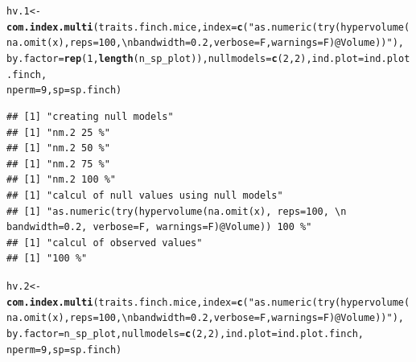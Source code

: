 \documentclass[12pt]{article}\usepackage[]{graphicx}\usepackage[]{color}
\makeatletter
\newcommand{\hlnum}[1]{\textcolor[rgb]{0.686,0.059,0.569}{#1}}%
\newcommand{\hlstr}[1]{\textcolor[rgb]{0.192,0.494,0.8}{#1}}%
\newcommand{\hlstd}[1]{\textcolor[rgb]{0.345,0.345,0.345}{#1}}%
\newcommand{\hlkwb}[1]{\textcolor[rgb]{0.69,0.353,0.396}{#1}}%
\newcommand{\hlkwc}[1]{\textcolor[rgb]{0.333,0.667,0.333}{#1}}%
\newcommand{\hlkwd}[1]{\textcolor[rgb]{0.737,0.353,0.396}{\textbf{#1}}}%
\newenvironment{kframe}{%
 \def\at@end@of@kframe{}%
 \ifinner\ifhmode%
  \def\at@end@of@kframe{\end{minipage}}%
  \begin{minipage}{\columnwidth}%
 \fi\fi%
 \def\FrameCommand##1{\hskip\@totalleftmargin \hskip-\fboxsep
 \colorbox{shadecolor}{##1}\hskip-\fboxsep
     \hskip-\linewidth \hskip-\@totalleftmargin \hskip\columnwidth}%
 \MakeFramed {\advance\hsize-\width
   \@totalleftmargin\z@ \linewidth\hsize
   \@setminipage}}%
 {\par\unskip\endMakeFramed%
 \at@end@of@kframe}
\newenvironment{knitrout}{}{} %
\makeatother
\begin{document}
\begin{knitrout}
\begin{kframe}
{\ttfamily\noindent\itshape\color{messagecolor}{\#\# Demo does not run by default to meet CRAN runtime requirements.\\\#\# This demo requires approximately 3 minutes to run.\\\#\# To run the demo, type\\\#\# 	doHypervolumeFinchDemo=TRUE\\\#\# 	demo(finch)\\\#\# at the R command line prompt.}}\end{kframe}
\end{knitrout}



\begin{knitrout}
\color{fgcolor}\begin{kframe}
\begin{alltt}
\hlstd{hv.1} \hlkwb{<-} \hlkwd{com.index.multi}\hlstd{(traits.finch.mice,} \hlkwc{index} \hlstd{=} \hlkwd{c}\hlstd{(}\hlstr{"as.numeric(try(hypervolume(na.omit(x), reps=100, \textbackslash{}n                                  bandwidth=0.2, verbose=F, warnings=F)@Volume))"}\hlstd{),}
    \hlkwc{by.factor} \hlstd{=} \hlkwd{rep}\hlstd{(}\hlnum{1}\hlstd{,} \hlkwd{length}\hlstd{(n_sp_plot)),} \hlkwc{nullmodels} \hlstd{=} \hlkwd{c}\hlstd{(}\hlnum{2}\hlstd{,} \hlnum{2}\hlstd{),} \hlkwc{ind.plot} \hlstd{= ind.plot.finch,}
    \hlkwc{nperm} \hlstd{=} \hlnum{9}\hlstd{,} \hlkwc{sp} \hlstd{= sp.finch)}
\end{alltt}
\begin{verbatim}
## [1] "creating null models"
## [1] "nm.2 25 %"
## [1] "nm.2 50 %"
## [1] "nm.2 75 %"
## [1] "nm.2 100 %"
## [1] "calcul of null values using null models"
## [1] "as.numeric(try(hypervolume(na.omit(x), reps=100, \n                                  bandwidth=0.2, verbose=F, warnings=F)@Volume)) 100 %"
## [1] "calcul of observed values"
## [1] "100 %"
\end{verbatim}
\begin{alltt}
\hlstd{hv.2} \hlkwb{<-} \hlkwd{com.index.multi}\hlstd{(traits.finch.mice,} \hlkwc{index} \hlstd{=} \hlkwd{c}\hlstd{(}\hlstr{"as.numeric(try(hypervolume(na.omit(x), reps=100, \textbackslash{}n                                  bandwidth=0.2, verbose=F, warnings=F)@Volume))"}\hlstd{),}
    \hlkwc{by.factor} \hlstd{= n_sp_plot,} \hlkwc{nullmodels} \hlstd{=} \hlkwd{c}\hlstd{(}\hlnum{2}\hlstd{,} \hlnum{2}\hlstd{),} \hlkwc{ind.plot} \hlstd{= ind.plot.finch,}
    \hlkwc{nperm} \hlstd{=} \hlnum{9}\hlstd{,} \hlkwc{sp} \hlstd{= sp.finch)}

\end{alltt}
\end{kframe}
\end{knitrout}
\end{document}
